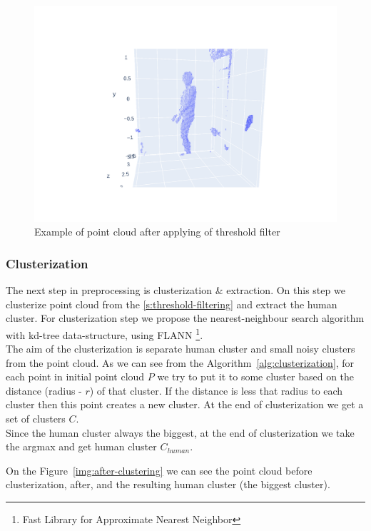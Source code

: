 \begin{figure}[htbp]
    \centerline{
            \includegraphics[trim=750 200 700 200,clip,scale=.35]{Figures/example-after-threshold.png}
    }
    \caption{Example of point cloud after applying of threshold filter}
    \label{img:after-threshold-filtering}
\end{figure}

\subsubsection{Clusterization}
The next step in preprocessing is clusterization \& extraction. On this step we clusterize point cloud from the \ref{s:threshold-filtering} and extract the human cluster. For clusterization step we propose the nearest-neighbour search algorithm \parencite{noauthor_nearest_2021} with kd-tree data-structure, using FLANN \footnote{Fast Library for Approximate Nearest Neighbor}. \\
The aim of the clusterization is separate human cluster and small noisy clusters from the point cloud. As we can see from the Algorithm~\ref{alg:clusterization}, for each point in initial point cloud $P$ we try to put it to some cluster based on the distance (radius - $r$) of that cluster. If the distance is less that radius to each cluster then this point creates a new cluster. At the end of clusterization we get a set of clusters $C$. \\
Since the human cluster always the biggest, at the end of clusterization we take the argmax and get human cluster $C_{human}$.

On the Figure~\ref{img:after-clustering} we can see the point cloud before clusterization, after, and the resulting human cluster (the biggest cluster). \\

